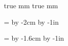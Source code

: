 \parindent=0pt

 true mm
 true mm

\hsize=\pdfpagewidth
\advance\hsize by -2cm
\hoffset=1cm
\advance\hoffset by -1in

\vsize=\pdfpageheight
\advance\vsize by -1.6cm
\voffset=0.8cm
\advance\voffset by -1in

\def\folio{}
